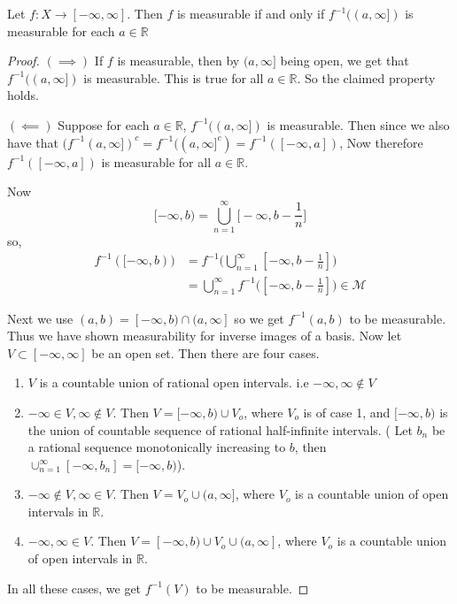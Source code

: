 \begin{lemma}
  Let $f: X \to [-\infty, \infty]$. Then $f$ is measurable if and only if $f^{-1}((a, \infty])$ is measurable for each $a \in \mathbb{R}$
\end{lemma}
\begin{proof}
  $(\implies)$ If $f$ is measurable, then by $(a, \infty]$ being open, we get that $f^{-1}((a, \infty])$ is measurable. This is true for all $   a \in \mathbb{R}$. So the claimed property holds.

  $(\impliedby)$ Suppose for each $a \in \mathbb{R}$, $f^{-1}((a, \infty])$ is measurable. Then since we also have that $(f^{-1}(a, \infty])^c = f^{-1}((a, \infty]^c) = f^{-1}([-\infty, a])$, Now therefore $f^{-1}([-\infty, a])$ is measurable for all $   a \in \mathbb{R}$.

  Now $$[-\infty, b) = \bigcup_{ n = 1}^{\infty}\Big[-\infty, b- \frac{1}{n} \Big]$$
  so, \begin{align*}
    f^{-1}([-\infty, b)) &= f^{-1}\Big(\bigcup_{n = 1}^{\infty}[-\infty, b- \frac{1}{n} ]\Big) \\ 
    & =  \bigcup_{n = 1}^{\infty}f^{-1}\Big([-\infty, b- \frac{1}{n} ]\Big) \in \mathcal{M}
  \end{align*}

  Next we use $(a, b) = [-\infty, b) \cap (a, \infty]$ so we get $f^{-1}(a, b)$ to be measurable. Thus we have shown measurability for inverse images of a basis. Now let $V \subset [-\infty, \infty]$ be an open set. Then there are four cases. \begin{enumerate}[]
    \item $V$ is a countable union of rational open intervals. i.e $-\infty, \infty \notin V$
    \item $-\infty \in V, \infty \notin V$. Then $ V = [-\infty, b) \cup V_o$, where $V_o$ is of case 1, and $[-\infty, b)$ is the union of countable sequence of rational half-infinite intervals. ( Let $b_n$ be a rational sequence monotonically increasing to $b$, then $\cup_{n = 1}^{\infty}[-\infty, b_n] = [-\infty, b)$).
    \item $-\infty \notin V, \infty \in V$. Then $V = V_o \cup (a, \infty]$, where $V_o$ is a countable union of open intervals in $\mathbb{R}$.
    \item $-\infty, \infty \in V$. Then $V = [-\infty, b) \cup V_o \cup (a, \infty]$, where $V_o$ is a countable union of open intervals in $\mathbb{R}$.
  \end{enumerate}
  In all these cases, we get $f^{-1}(V)$ to be measurable.
\end{proof}

